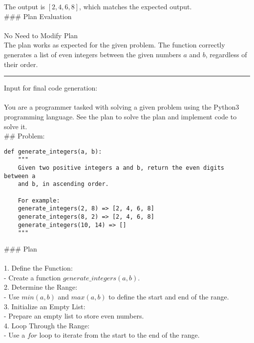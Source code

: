 The output is $[2, 4, 6, 8]$, which matches the expected output. \\

\#\#\# Plan Evaluation \\
 \\
\*\*No Need to Modify Plan\*\* \\

The plan works as expected for the given problem. The function correctly generates a list of even integers between the given numbers $a$ and $b$, regardless of their order. \\


\vspace{0.5cm} \hrule   \vspace{0.5cm}
Input for final code generation: \\
 \\

You are a programmer tasked with solving a given problem using the \*\*Python3\*\* programming language. See the plan to solve the plan and implement code to solve it. \\

\#\# Problem: \\
\begin{verbatim}
def generate_integers(a, b):
    """
    Given two positive integers a and b, return the even digits between a
    and b, in ascending order.

    For example:
    generate_integers(2, 8) => [2, 4, 6, 8]
    generate_integers(8, 2) => [2, 4, 6, 8]
    generate_integers(10, 14) => []
    """
\end{verbatim}

\#\#\# Plan \\
 \\
1. \*\*Define the Function:\*\* \\
   - Create a function $generate\_integers(a, b)$. \\

2. \*\*Determine the Range:\*\* \\
   - Use $min(a, b)$ and $max(a, b)$ to define the start and end of the range. \\

3. \*\*Initialize an Empty List:\*\* \\
   - Prepare an empty list to store even numbers. \\

4. \*\*Loop Through the Range:\*\* \\
   - Use a $for$ loop to iterate from the start to the end of the range. \\

